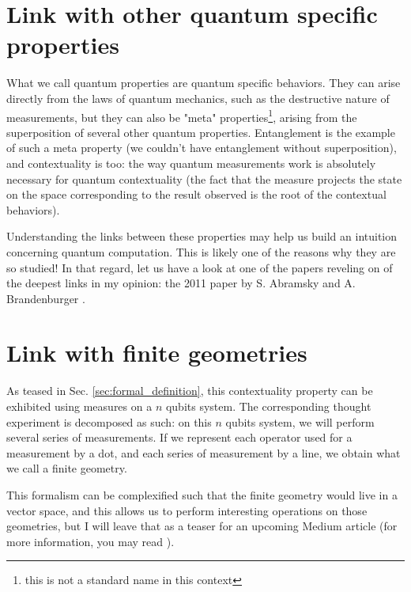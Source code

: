\documentclass{article}
\begin{document}
\section{Link with other quantum specific properties}
\label{sec:link_with_other_quantum_specific_properties}

What we call quantum properties are quantum specific behaviors. They can arise
directly from the laws of quantum mechanics, such as the destructive nature of
measurements, but they can also be "meta" properties\footnote{this is not a
standard name in this context}, arising from the superposition of several other
quantum properties. Entanglement is the example of such a meta property
(we couldn't have entanglement without superposition), and contextuality is too:
the way quantum measurements work is absolutely necessary for quantum
contextuality (the fact that the measure projects the state on the space
corresponding to the result observed is the root of the contextual behaviors).

Understanding the links between these properties may help us build an intuition
concerning quantum computation. This is likely one of the reasons why they are
so studied! In that regard, let us have a look at one of the papers reveling on
of the deepest links in my opinion: the 2011 paper by S. Abramsky and A.
Brandenburger \cite{AB11}.

\section{Link with finite geometries}
\label{sec:link_with_finite_geometries}

As teased in Sec. \ref{sec:formal_definition}, this contextuality property can
be exhibited using measures on a $n$ qubits system. The corresponding thought
experiment is decomposed as such: on this $n$ qubits system, we will perform
several series of measurements. If we represent each operator used for a
measurement by a dot, and each series of measurement by a line, we obtain what we
call a finite geometry. 

This formalism can be complexified such that the finite geometry would live in a
vector space, and this allows us to perform interesting operations on those
geometries, but I will leave that as a teaser for an upcoming Medium article
(for more information, you may read \cite{dHG+22}).
\end{document}
